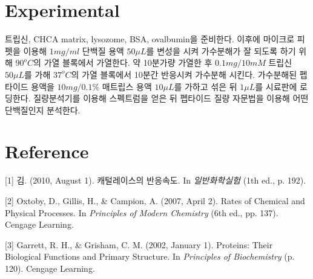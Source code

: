 \documentclass[%
 reprint,
 amsmath,amssymb,
 aps,
]{revtex4-2}
\begin{document}
\section{\label{sec:level1}Experimental}
트립신, CHCA matrix, lysozome, BSA, ovalbumin을 준비한다. 이후에 마이크로 피펫을 이용해 $1mg/ml$ 단백질 용액 $50\mu L$를 변성을 시켜 가수분해가 잘 되도록 하기 위해 $90^{o}C$의 가열 블록에서 가열한다. 약 10분가량 가열한 후 $0.1mg/10mM$ 트립신 $50\mu L$를 가해 $37^{o}C$의 가열 블록에서 10분간 반응시켜 가수분해 시킨다. 가수분해된 펩타이드 용액을 $10mg/0.1\%$ 매트립스 용액 $10\mu L$를 가하고 섞은 뒤 $1\mu L$를 시료판에 로딩한다. 질량분석기를 이용해 스펙트럼을 얻은 뒤 펩타이드 질량 자문법을 이용해 어떤 단백질인지 분석한다.

\section{\label{sec:level1}Reference}
[1] 김. (2010, August 1). 캐털레이스의 반응속도. In \textit{일반화학실험} (1th ed., p. 192).

[2] Oxtoby, D., Gillis, H., \& Campion, A. (2007, April 2). Rates of Chemical and Physical Processes. In \textit{Principles of Modern Chemistry} (6th ed., pp. 137). Cengage Learning.

[3] Garrett, R. H., \& Grisham, C. M. (2002, January 1). Proteins: Their Biological Functions and Primary Structure. In \textit{Principles of Biochemistry} (p. 120). Cengage Learning.
\end{document}
